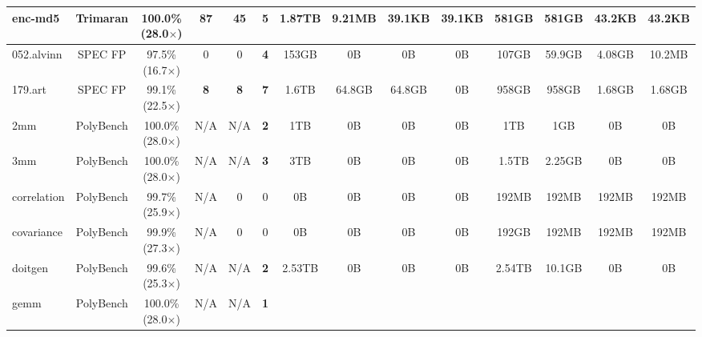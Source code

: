 {\begin{tabular}{|l|c|c||c|c||c||c|c|c|c||c|c|c|c|}
\hline
enc-md5    & Trimaran & 100.0\% (28.0$\times$) & \textbf{87} & \textbf{45} & \textbf{5} &
           1.87TB & 9.21MB & 39.1KB & 39.1KB & 581GB & 581GB & 43.2KB & 43.2KB \\ %
\hline
052.alvinn & SPEC FP  & 97.5\% (16.7$\times$) & 0 & 0 & \textbf{4} &
           153GB & 0B & 0B & 0B & 107GB & 59.9GB & 4.08GB & 10.2MB \\  %
\hline
179.art    & SPEC FP  & 99.1\% (22.5$\times$) & \textbf{8} & \textbf{8} & \textbf{7} &
           1.6TB & 64.8GB & 64.8GB & 0B & 958GB & 958GB & 1.68GB & 1.68GB \\ %
\hline
2mm        & PolyBench & 100.0\% (28.0$\times$)  & N/A & N/A & \textbf{2} &
           1TB & 0B & 0B & 0B & 1TB & 1GB & 0B & 0B \\ %
\hline
3mm        & PolyBench & 100.0\% (28.0$\times$)  & N/A & N/A & \textbf{3} &
           3TB & 0B & 0B & 0B & 1.5TB & 2.25GB & 0B & 0B \\ %
\hline
correlation & PolyBench & 99.7\% (25.9$\times$) & N/A & 0  & 0 &
            0B & 0B & 0B & 0B & 192MB & 192MB & 192MB & 192MB \\ %
\hline
covariance & PolyBench & 99.9\% (27.3$\times$) & N/A & 0 & 0 &
           0B & 0B & 0B & 0B & 192GB & 192MB & 192MB & 192MB \\ %
\hline
doitgen   & PolyBench & 99.6\% (25.3$\times$) & N/A & N/A & \textbf{2} &
          2.53TB & 0B & 0B & 0B & 2.54TB & 10.1GB & 0B & 0B \\ %
\hline
gemm     & PolyBench  & 100.0\% (28.0$\times$) & N/A & N/A & \textbf{1} &

\end{tabular}}
